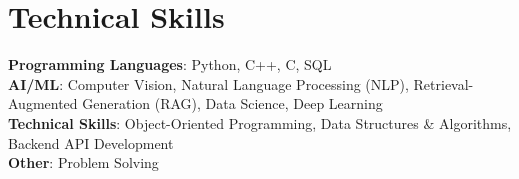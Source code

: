 \documentclass[letterpaper,11pt]{article}
\begin{document}
\section{Technical Skills}
 \begin{itemize}[leftmargin=0.15in, label={}]
    \small{\item{
           \textbf{Programming Languages}{: Python, C++, C, SQL} \\
           \textbf{AI/ML}{: Computer Vision, Natural Language Processing (NLP), Retrieval-Augmented Generation (RAG), Data Science, Deep Learning} \\
           \textbf{Technical Skills}{: Object-Oriented Programming, Data Structures \& Algorithms, Backend API Development} \\
           \textbf{Other}{: Problem Solving} \\
         }}
 \end{itemize}
\end{document}
